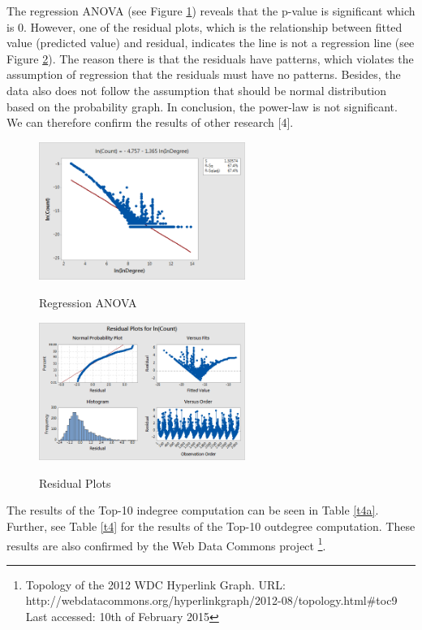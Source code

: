 The regression ANOVA (see Figure \ref{fig14}) reveals that the p-value is significant which is 0. However, one of the residual plots, which is the relationship between fitted value (predicted value) and residual, indicates the line is not a regression line (see Figure \ref{fig15}). The reason there is that the residuals have patterns, which violates the assumption of regression that the residuals must have no patterns. Besides, the data also does not follow the assumption that should be normal distribution based on the probability graph. In conclusion, the power-law is not significant. We can therefore confirm the results of other research [4].

\begin{figure}[H]
	\begin{center}
		\label{fig14}		
		\includegraphics[width=0.6\textwidth]{fig14}	
		\caption{Regression ANOVA}	
	\end{center}
\end{figure}	
\begin{figure}[H]	
	\begin{center}
		\label{fig15}		
		\includegraphics[width=0.6\textwidth]{fig15}	
		\caption{Residual Plots}	
	\end{center}
\end{figure}

The results of the Top-10 indegree computation can be seen in Table \ref{t4a}. Further, see Table \ref{t4} for the results of the Top-10 outdegree computation. These results are also confirmed by the Web Data Commons project \footnote{Topology of the 2012 WDC Hyperlink Graph. URL: http://webdatacommons.org/hyperlinkgraph/2012-08/topology.html\#toc9 Last accessed: 10th of February 2015}.

